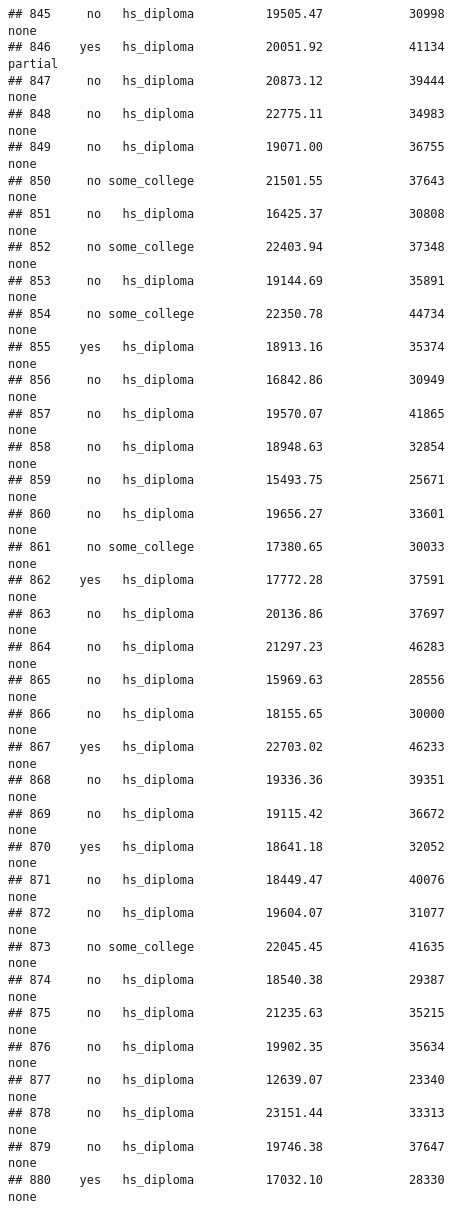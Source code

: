 \documentclass[
]{article}
\begin{document}
\begin{verbatim}
## 845     no   hs_diploma          19505.47            30998        none
## 846    yes   hs_diploma          20051.92            41134     partial
## 847     no   hs_diploma          20873.12            39444        none
## 848     no   hs_diploma          22775.11            34983        none
## 849     no   hs_diploma          19071.00            36755        none
## 850     no some_college          21501.55            37643        none
## 851     no   hs_diploma          16425.37            30808        none
## 852     no some_college          22403.94            37348        none
## 853     no   hs_diploma          19144.69            35891        none
## 854     no some_college          22350.78            44734        none
## 855    yes   hs_diploma          18913.16            35374        none
## 856     no   hs_diploma          16842.86            30949        none
## 857     no   hs_diploma          19570.07            41865        none
## 858     no   hs_diploma          18948.63            32854        none
## 859     no   hs_diploma          15493.75            25671        none
## 860     no   hs_diploma          19656.27            33601        none
## 861     no some_college          17380.65            30033        none
## 862    yes   hs_diploma          17772.28            37591        none
## 863     no   hs_diploma          20136.86            37697        none
## 864     no   hs_diploma          21297.23            46283        none
## 865     no   hs_diploma          15969.63            28556        none
## 866     no   hs_diploma          18155.65            30000        none
## 867    yes   hs_diploma          22703.02            46233        none
## 868     no   hs_diploma          19336.36            39351        none
## 869     no   hs_diploma          19115.42            36672        none
## 870    yes   hs_diploma          18641.18            32052        none
## 871     no   hs_diploma          18449.47            40076        none
## 872     no   hs_diploma          19604.07            31077        none
## 873     no some_college          22045.45            41635        none
## 874     no   hs_diploma          18540.38            29387        none
## 875     no   hs_diploma          21235.63            35215        none
## 876     no   hs_diploma          19902.35            35634        none
## 877     no   hs_diploma          12639.07            23340        none
## 878     no   hs_diploma          23151.44            33313        none
## 879     no   hs_diploma          19746.38            37647        none
## 880    yes   hs_diploma          17032.10            28330        none

\end{verbatim}
\end{document}
